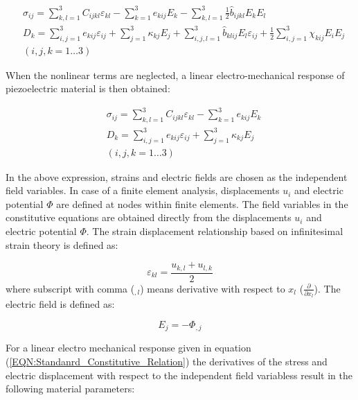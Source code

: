 \begin{equation}
\begin{aligned}
&\sigma _{ij} = 
\sum_{k,l=1}^3 {C_{ijkl}}{\varepsilon _{kl}} - 
\sum_{k=1}^3 e_{kij}{E_k} -
\sum_{k,l=1}^3 \frac{1}{2}\hat{b}_{ijkl}{E_k}{E_l}\\
&{D_k} =  
\sum_{i,j=1}^3 {e_{kij}}{\varepsilon _{ij}} + 
\sum_{j=1}^3 {\kappa _{kj}}{E_j}+
\sum_{i,j,l=1}^3 \hat{b}_{klij}{E_l}\varepsilon _{ij}+
\frac{1}{2} 
\sum_{i,j=1}^3 \chi_{kij}{E_i}{E_j} \\
& (i,j,k=1 \dots 3)  
\end{aligned}
\label{EQN:Non_Linear_Constitutive_Relation}
\end{equation}

When the nonlinear terms are neglected, a linear electro-mechanical response of piezoelectric material \cite{Leo2007} is then obtained:

\begin{equation}
\begin{aligned}
&\sigma _{ij} = 
\sum_{k,l=1}^3 {C_{ijkl}}{\varepsilon _{kl}} - 
\sum_{k=1}^3 {e_{kij}}{E_k}\\
&{D_k} = 
\sum_{i,j=1}^3 e_{kij}\varepsilon _{ij} + 
\sum_{j=1}^3 \kappa _{kj}{E_j}\\
& (i,j,k=1 \dots 3)
\end{aligned}
\label{EQN:Standanrd_Constitutive_Relation}
\end{equation}

In the above expression, strains and electric fields are chosen as the independent field variables. 
In case of a finite element analysis, displacements $u_i$ and electric potential $\Phi$ are defined at nodes within finite elements. 
The field variables in the constitutive equations are obtained directly from the displacements $u_i$ and electric potential $\Phi$. 
The strain displacement relationship based on infinitesimal strain theory is defined as:

\begin{equation}
\varepsilon_{kl}=\frac{u_{k,l}+u_{l,k}}{2}
\label{EQN:Linear_Displacement}
\end{equation}
where subscript with comma ($_{,l}$) means derivative with respect to $x_l$ ($\frac{\partial}{\partial x_l}$). 
The electric field is defined as:

\begin{equation}
E_j=-\Phi_{,j}
\label{EQN:Linear_Electric_Field}
\end{equation}

For a linear electro mechanical response given in equation
(\ref{EQN:Standanrd_Constitutive_Relation}) the derivatives of the stress and
electric displacement with respect to the independent field variabless result in
the following material parameters:

